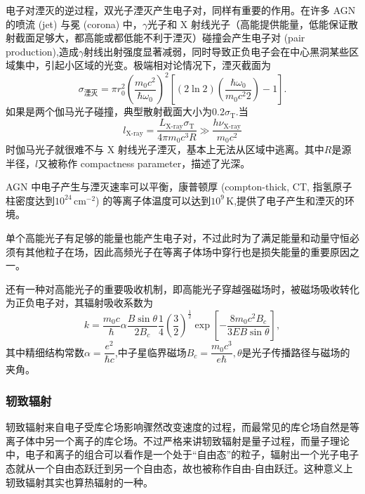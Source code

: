 \documentclass[../天体物理基础.tex]{subfiles}
\begin{document}
电子对湮灭的逆过程，双光子湮灭产生电子对，同样有重要的作用。在许多 AGN 的喷流 (jet) 与冕 (corona) 中，$\gamma$光子和 X 射线光子（高能提供能量，低能保证散射截面足够大，都高能或都低能不利于湮灭）碰撞会产生电子对 (pair production),造成$\gamma$射线出射强度显著减弱，同时导致正负电子会在中心黑洞某些区域集中，引起小区域的光变。极端相对论情况下，湮灭截面为
\begin{equation}
\sigma_{\text{湮灭}}=\pi r_{0}^{2}\left(\frac{m_{0}c^{2}}{\hbar\omega_{0}}\right)^{2}\left[\left(2\ln2\right)\left(\frac{\hbar\omega_{0}}{m_{0}c^{2}2}\right)-1\right].
\end{equation}
如果是两个伽马光子碰撞，典型散射截面大小为$0.2\sigma_{\text{T}}$.当
\begin{equation}
l_{\text{X-ray}}=\frac{L_{\text{X-ray}}\sigma_{\text{T}}}{4\pi m_{0}c^{3}R}\gg\frac{h\nu_{\text{X-ray}}}{m_{0}c^{2}}
\end{equation}
时伽马光子就很难不与 X 射线光子湮灭，基本上无法从区域中逃离。其中$R$是源半径，$l$又被称作 compactness parameter，描述了光深。

AGN 中电子产生与湮灭速率可以平衡，康普顿厚 (compton-thick, CT, 指氢原子柱密度达到$10^{24}\,\mathrm{cm^{-2}}$) 的等离子体温度可以达到$10^{9}\,\mathrm{K}$,提供了电子产生和湮灭的环境。

单个高能光子有足够的能量也能产生电子对，不过此时为了满足能量和动量守恒必须有其他粒子在场，因此高频光子在等离子体场中穿行也是损失能量的重要原因之一。

还有一种对高能光子的重要吸收机制，即高能光子穿越强磁场时，被磁场吸收转化为正负电子对，其辐射吸收系数为
\begin{equation}
k=\frac{m_{0}c}{\hbar}\alpha\frac{B\sin\theta}{2B_{c}}\frac{1}{4}\left(\frac{3}{2}\right)^{\frac{1}{2}}\exp\left[-\frac{8m_{0}c^{2}B_{c}}{3EB\sin\theta}\right],
\end{equation}
其中精细结构常数$\alpha=\dfrac{e^{2}}{\hbar c}$,中子星临界磁场$B_{c}=\dfrac{m_{0}c^{3}}{e\hbar},\theta$是光子传播路径与磁场的夹角。

\subsubsection{轫致辐射}
轫致辐射来自电子受库仑场影响骤然改变速度的过程，而最常见的库仑场自然是等离子体中另一个离子的库仑场。不过严格来讲轫致辐射是量子过程，而量子理论中，电子和离子的组合可以看作是一个处于“自由态”的粒子，辐射出一个光子电子态就从一个自由态跃迁到另一个自由态，故也被称作自由{}-{}自由跃迁。这种意义上轫致辐射其实也算热辐射的一种。
\end{document}
